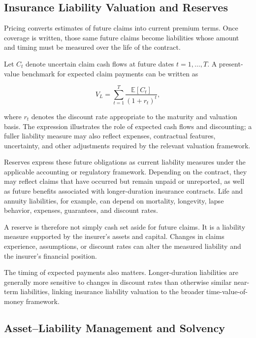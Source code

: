 \subsection{Insurance Liability Valuation and Reserves}

Pricing converts estimates of future claims into current premium terms. Once coverage is written, those same future claims become liabilities whose amount and timing must be measured over the life of the contract.

Let $C_t$ denote uncertain claim cash flows at future dates $t=1,\ldots,T$. A present-value benchmark for expected claim payments can be written as

\begin{equation}
V_L=\sum_{t=1}^{T}
\frac{\mathbb{E}[C_t]}{(1+r_t)^t},
\label{eq:ch15-insurance-liability-pv}
\end{equation}

where $r_t$ denotes the discount rate appropriate to the maturity and valuation basis. The expression illustrates the role of expected cash flows and discounting; a fuller liability measure may also reflect expenses, contractual features, uncertainty, and other adjustments required by the relevant valuation framework.

Reserves express these future obligations as current liability measures under the applicable accounting or regulatory framework. Depending on the contract, they may reflect claims that have occurred but remain unpaid or unreported, as well as future benefits associated with longer-duration insurance contracts. Life and annuity liabilities, for example, can depend on mortality, longevity, lapse behavior, expenses, guarantees, and discount rates.

A reserve is therefore not simply cash set aside for future claims. It is a liability measure supported by the insurer's assets and capital. Changes in claims experience, assumptions, or discount rates can alter the measured liability and the insurer's financial position.

The timing of expected payments also matters. Longer-duration liabilities are generally more sensitive to changes in discount rates than otherwise similar near-term liabilities, linking insurance liability valuation to the broader time-value-of-money framework.



\subsection{Asset--Liability Management and Solvency}

